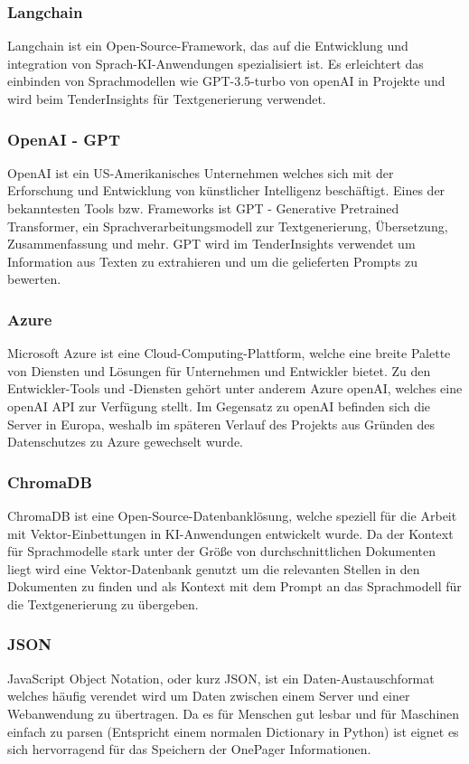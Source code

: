 \subsubsection{Langchain}
Langchain ist ein Open-Source-Framework, das auf die Entwicklung und integration von Sprach-KI-Anwendungen spezialisiert ist.
Es erleichtert das einbinden von Sprachmodellen wie GPT-3.5-turbo von openAI in Projekte und wird beim TenderInsights für 
Textgenerierung verwendet.

\subsubsection{OpenAI - GPT}
OpenAI ist ein US-Amerikanisches Unternehmen welches sich mit der Erforschung und Entwicklung von künstlicher Intelligenz beschäftigt.
Eines der bekanntesten Tools bzw. Frameworks ist GPT - Generative Pretrained Transformer, ein Sprachverarbeitungsmodell zur Textgenerierung, 
Übersetzung, Zusammenfassung und mehr. GPT wird im TenderInsights verwendet um Information aus Texten zu extrahieren und um die 
gelieferten Prompts zu bewerten.

\subsubsection{Azure}
Microsoft Azure ist eine Cloud-Computing-Plattform, welche eine breite Palette von Diensten und Lösungen für Unternehmen und Entwickler bietet.
Zu den Entwickler-Tools und -Diensten gehört unter anderem Azure openAI, welches eine openAI API zur Verfügung stellt. Im Gegensatz zu openAI 
befinden sich die Server in Europa, weshalb im späteren Verlauf des Projekts aus Gründen des Datenschutzes zu Azure gewechselt wurde.

\subsubsection{ChromaDB}
ChromaDB ist eine Open-Source-Datenbanklösung, welche speziell für die Arbeit mit Vektor-Einbettungen in KI-Anwendungen entwickelt wurde.
Da der Kontext für Sprachmodelle stark unter der Größe von durchschnittlichen Dokumenten liegt wird eine Vektor-Datenbank genutzt um die relevanten
Stellen in den Dokumenten zu finden und als Kontext mit dem Prompt an das Sprachmodell für die Textgenerierung zu übergeben.

\subsubsection{JSON}
JavaScript Object Notation, oder kurz JSON, ist ein Daten-Austauschformat welches häufig verendet wird um Daten zwischen einem Server und einer 
Webanwendung zu übertragen. Da es für Menschen gut lesbar und für Maschinen einfach zu parsen (Entspricht einem normalen Dictionary in Python) 
ist eignet es sich hervorragend für das Speichern der OnePager Informationen.


